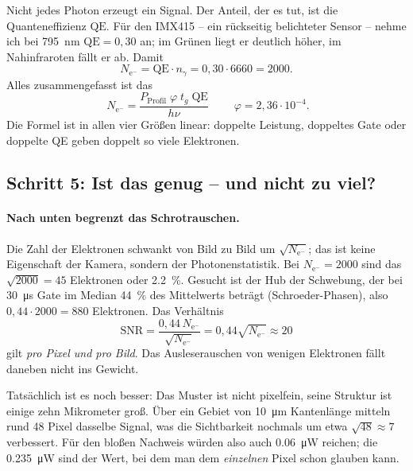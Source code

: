 \documentclass[11pt,a4paper]{article}
\begin{document}
Nicht jedes Photon erzeugt ein Signal. Der Anteil, der es tut, ist die
Quanteneffizienz $\mathrm{QE}$. F\"ur den IMX415 -- ein r\"uckseitig belichteter
Sensor -- nehme ich bei \SI{795}{\nano\meter} $\mathrm{QE}=0{,}30$ an; im Gr\"unen
liegt er deutlich h\"oher, im Nahinfraroten f\"allt er ab. Damit
\begin{equation}
  N_{\mathrm{e}^-} = \mathrm{QE}\cdot n_\gamma = 0{,}30\cdot6660 = 2000 .
  \label{eq:elektronen}
\end{equation}
Alles zusammengefasst ist das
\begin{equation}
  \boxed{\;N_{\mathrm{e}^-}
  = \frac{P_\mathrm{Profil}\;\varphi\;t_g\;\mathrm{QE}}{h\nu}\;}
  \qquad \varphi = 2{,}36\cdot10^{-4} .
  \label{eq:kette}
\end{equation}
Die Formel ist in allen vier Gr\"o\ss{}en linear: doppelte Leistung, doppeltes Gate
oder doppelte QE geben doppelt so viele Elektronen.

\subsection*{Schritt 5: Ist das genug -- und nicht zu viel?}

\paragraph{Nach unten begrenzt das Schrotrauschen.} Die Zahl der Elektronen
schwankt von Bild zu Bild um $\sqrt{N_{\mathrm{e}^-}}$; das ist keine Eigenschaft
der Kamera, sondern der Photonenstatistik. Bei $N_{\mathrm{e}^-}=2000$ sind das
$\sqrt{2000}=45$ Elektronen oder \SI{2,2}{\percent}. Gesucht ist der Hub der
Schwebung, der bei \SI{30}{\micro\second} Gate im Median \SI{44}{\percent} des
Mittelwerts betr\"agt (Schroeder-Phasen), also $0{,}44\cdot2000=880$ Elektronen.
Das Verh\"altnis
\begin{equation}
  \mathrm{SNR} = \frac{0{,}44\,N_{\mathrm{e}^-}}{\sqrt{N_{\mathrm{e}^-}}}
               = 0{,}44\sqrt{N_{\mathrm{e}^-}} \approx 20
  \label{eq:snr}
\end{equation}
gilt \emph{pro Pixel und pro Bild}. Das Ausleserauschen von wenigen Elektronen
f\"allt daneben nicht ins Gewicht.

Tats\"achlich ist es noch besser: Das Muster ist nicht pixelfein, seine Struktur
ist einige zehn Mikrometer gro\ss{}. \"Uber ein Gebiet von \SI{10}{\micro\meter}
Kantenl\"ange mitteln rund 48 Pixel dasselbe Signal, was die Sichtbarkeit
nochmals um etwa $\sqrt{48}\approx7$ verbessert. F\"ur den blo\ss{}en Nachweis
w\"urden also auch \SI{0,06}{\micro\watt} reichen; die \SI{0,235}{\micro\watt} sind
der Wert, bei dem man dem \emph{einzelnen} Pixel schon glauben kann.
\end{document}
